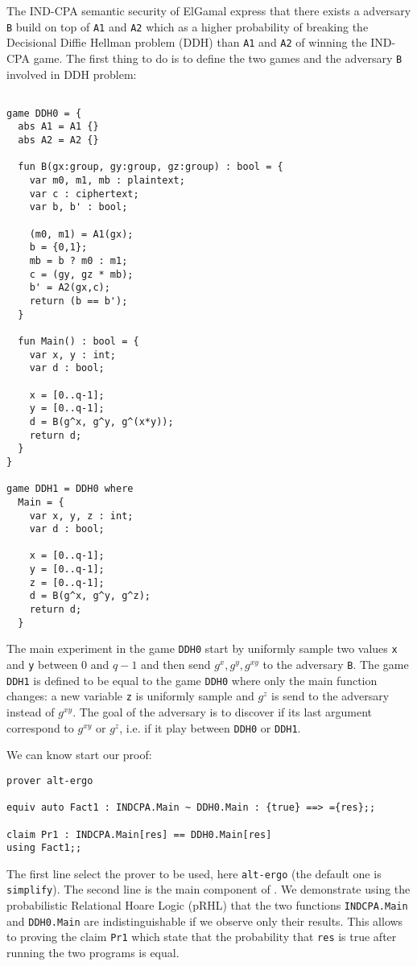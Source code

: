 The IND-CPA semantic security of ElGamal express that there exists a 
adversary \verb+B+ build on top of \verb+A1+ and \verb+A2+ which as a higher 
probability of breaking the Decisional Diffie Hellman problem (DDH) than
\verb+A1+ and \verb+A2+ of winning the IND-CPA game. 
The first thing to do is to define the two games and the 
adversary \verb+B+ involved in DDH problem:
\begin{verbatim}

game DDH0 = {
  abs A1 = A1 {}
  abs A2 = A2 {}
  
  fun B(gx:group, gy:group, gz:group) : bool = {
    var m0, m1, mb : plaintext;
    var c : ciphertext;
    var b, b' : bool;
 
    (m0, m1) = A1(gx);
    b = {0,1};
    mb = b ? m0 : m1;
    c = (gy, gz * mb);
    b' = A2(gx,c);
    return (b == b');
  }

  fun Main() : bool = {
    var x, y : int;
    var d : bool;

    x = [0..q-1];
    y = [0..q-1];
    d = B(g^x, g^y, g^(x*y));
    return d;
  }     
}

game DDH1 = DDH0 where 
  Main = {
    var x, y, z : int;
    var d : bool;

    x = [0..q-1];
    y = [0..q-1];
    z = [0..q-1];
    d = B(g^x, g^y, g^z);
    return d;
  } 

\end{verbatim}
The main experiment in the game \verb+DDH0+ start by uniformly sample
two values \verb+x+ and \verb+y+ between 0 and $q-1$ and then 
send $g^x, g^y, g^{xy}$ to the adversary \verb+B+. The game \verb+DDH1+
is defined to be equal to the game \verb+DDH0+ where only the main function
changes: a new variable \verb+z+ is uniformly sample and $g^z$ is send
to the adversary instead of $g^{xy}$. The goal of the adversary is to discover
if its last argument correspond to $g^{xy}$ or $g^z$, i.e. if it play
between \verb+DDH0+ or \verb+DDH1+.

We can know start our proof:
\begin{verbatim}
prover alt-ergo

equiv auto Fact1 : INDCPA.Main ~ DDH0.Main : {true} ==> ={res};;

claim Pr1 : INDCPA.Main[res] == DDH0.Main[res] 
using Fact1;;
\end{verbatim}
The first line select the prover to be used, here \verb+alt-ergo+ (the
default one is \verb+simplify+). The second line is the main component of
\easycrypt. We demonstrate using the probabilistic Relational Hoare Logic (pRHL)
that the two functions \verb+INDCPA.Main+ and \verb+DDH0.Main+ are 
indistinguishable if we observe only their results.
This allows to proving the claim \verb+Pr1+ which state that the probability
that \verb+res+ is true after running the two programs is equal.

